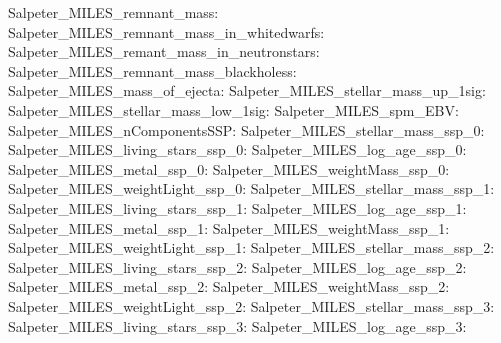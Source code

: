 Salpeter\_MILES\_remnant\_mass:  \newline 
Salpeter\_MILES\_remnant\_mass\_in\_whitedwarfs:  \newline 
Salpeter\_MILES\_remant\_mass\_in\_neutronstars:  \newline 
Salpeter\_MILES\_remnant\_mass\_blackholess:  \newline 
Salpeter\_MILES\_mass\_of\_ejecta:  \newline 
Salpeter\_MILES\_stellar\_mass\_up\_1sig:  \newline 
Salpeter\_MILES\_stellar\_mass\_low\_1sig:  \newline 
Salpeter\_MILES\_spm\_EBV:  \newline 
Salpeter\_MILES\_nComponentsSSP:  \newline 
Salpeter\_MILES\_stellar\_mass\_ssp\_0:  \newline 
Salpeter\_MILES\_living\_stars\_ssp\_0:  \newline 
Salpeter\_MILES\_log\_age\_ssp\_0:  \newline 
Salpeter\_MILES\_metal\_ssp\_0:  \newline 
Salpeter\_MILES\_weightMass\_ssp\_0:  \newline 
Salpeter\_MILES\_weightLight\_ssp\_0:  \newline 
Salpeter\_MILES\_stellar\_mass\_ssp\_1:  \newline 
Salpeter\_MILES\_living\_stars\_ssp\_1:  \newline 
Salpeter\_MILES\_log\_age\_ssp\_1:  \newline 
Salpeter\_MILES\_metal\_ssp\_1:  \newline 
Salpeter\_MILES\_weightMass\_ssp\_1:  \newline 
Salpeter\_MILES\_weightLight\_ssp\_1:  \newline 
Salpeter\_MILES\_stellar\_mass\_ssp\_2:  \newline 
Salpeter\_MILES\_living\_stars\_ssp\_2:  \newline 
Salpeter\_MILES\_log\_age\_ssp\_2:  \newline 
Salpeter\_MILES\_metal\_ssp\_2:  \newline 
Salpeter\_MILES\_weightMass\_ssp\_2:  \newline 
Salpeter\_MILES\_weightLight\_ssp\_2:  \newline 
Salpeter\_MILES\_stellar\_mass\_ssp\_3:  \newline 
Salpeter\_MILES\_living\_stars\_ssp\_3:  \newline 
Salpeter\_MILES\_log\_age\_ssp\_3:  \newline 
